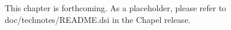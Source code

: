 \label{User_Defined_Domain_Maps}

This chapter is forthcoming.  As a placeholder, please refer to
doc/technotes/README.dsi in the Chapel release.
